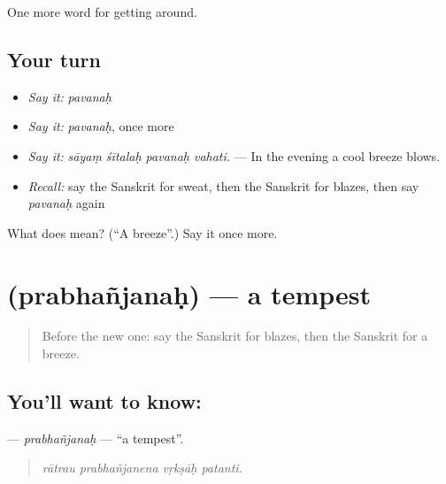 \begin{grammarlens}[title={What you've built}]
One more word for getting around.
\end{grammarlens}

\subsection*{Your turn}
\begin{itemize}
\raggedright
  \item \emph{Say it:} \emph{pavanaḥ}
  \item \emph{Say it:} \emph{pavanaḥ}, once more
  \item \emph{Say it:} \emph{sāyaṃ śītalaḥ pavanaḥ vahati.} — In the evening a cool breeze blows.
  \item \emph{Recall:} say the Sanskrit for sweat, then the Sanskrit for blazes, then say \emph{pavanaḥ} again
\end{itemize}

\begin{tcolorbox}[breakable,colback=teal!4,colframe=teal!35!black,title={Before you move on}]
What does  mean? (\textquotedblleft{}A breeze\textquotedblright{}.) Say it once more.
\end{tcolorbox}
\section[\texorpdfstring{\sk{प्रभञ्जनः} (prabhañjanaḥ)}{प्रभञ्जनः (prabhañjanaḥ)}]{ (prabhañjanaḥ) — a tempest}

\label{lesson:SA-C439-prabhanjanah}



\begin{quote}
Before the new one: say the Sanskrit for blazes, then the Sanskrit for a breeze.
\end{quote}

\subsection*{You'll want to know: }
\textbf{} — \emph{prabhañjanaḥ} — \textquotedblleft{}a tempest\textquotedblright{}.

\begin{quote}
   
\end{quote}

\begin{quote}
\emph{rātrau prabhañjanena vṛkṣāḥ patanti.}
\end{quote}

